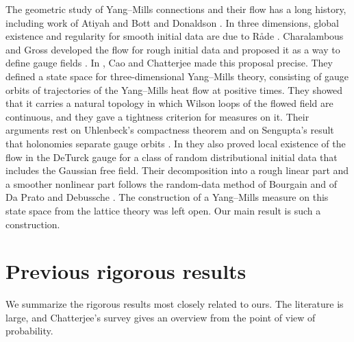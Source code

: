 The geometric study of Yang--Mills connections and their flow has a long history, including work of Atiyah and Bott \cite{AtiyahBott1983} and Donaldson \cite{Donaldson1983,Donaldson1985}. In three dimensions, global existence and regularity for smooth initial data are due to R\aa de \cite{Rade1992}. Charalambous and Gross developed the flow for rough initial data and proposed it as a way to define gauge fields \cite{CharalambousGross2013,CharalambousGross2015,CharalambousGross2017,Gross2022}. In \cite{CCState2023v4}, Cao and Chatterjee made this proposal precise. They defined a state space for three-dimensional Yang--Mills theory, consisting of gauge orbits of trajectories of the Yang--Mills heat flow at positive times. They showed that it carries a natural topology in which Wilson loops of the flowed field are continuous, and they gave a tightness criterion for measures on it. Their arguments rest on Uhlenbeck's compactness theorem \cite{Uhlenbeck1982Connections} and on Sengupta's result that holonomies separate gauge orbits \cite{Sengupta1994}. In \cite{CCHeat2022v4} they also proved local existence of the flow in the DeTurck gauge for a class of random distributional initial data that includes the Gaussian free field. Their decomposition into a rough linear part and a smoother nonlinear part follows the random-data method of Bourgain \cite{Bourgain1996} and of Da Prato and Debussche \cite{DaPratoDebussche2003}. The construction of a Yang--Mills measure on this state space from the lattice theory was left open. Our main result is such a construction.

\section{Previous rigorous results}\label{s1:previous}

We summarize the rigorous results most closely related to ours. The literature is large, and Chatterjee's survey \cite{Chatterjee2019Survey} gives an overview from the point of view of probability.

